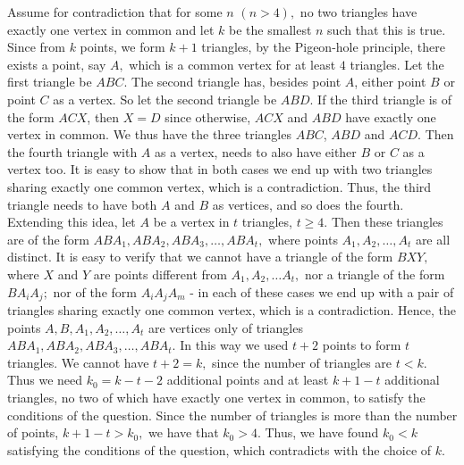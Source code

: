 \documentclass{article}
\begin{document}
\begin{enumerate}[1.]
Assume for contradiction that for some $n$ $(n>4),$ no two triangles have exactly one vertex in common and let $k$ be the smallest $n$ such that this is true. Since from $k$ points, we form $k+1$ triangles, by the Pigeon-hole principle, there exists a point, say $A,$ which is a common vertex for at least $4$ triangles. Let the first triangle be $ABC$. The second triangle has, besides point $A$, either point $B$ or point $C$ as a vertex. So let the second triangle be $ABD$. If the third triangle is of the form $ACX$, then $X=D$ since otherwise, $ACX$ and $ABD$ have exactly one vertex in common. We thus have the three triangles $ABC$, $ABD$ and $ACD$. Then the fourth triangle with $A$ as a vertex, needs to also have either $B$ or $C$ as a vertex too. It is easy to show that in both cases we end up with two triangles sharing exactly one common vertex, which is a contradiction. Thus, the third triangle needs to have both $A$ and $B$ as vertices, and so does the fourth. \\
Extending this idea, let $A$ be a vertex in $t$ triangles, $t\geq 4.$ Then these triangles are of the form $ABA_1, ABA_2, ABA_3, \dots , ABA_t,$ where points $A_1, A_2, \dots , A_t$ are all distinct. It is easy to verify that we cannot have a triangle of the form $BXY,$ where $X$ and $Y$ are points different from $A_1, A_2, \dots A_t,$ nor a triangle of the form $BA_iA_j;$ nor of the form $A_iA_jA_m$ - in each of these cases we end up with a pair of triangles sharing exactly one common vertex, which is a contradiction. Hence, the points $A, B, A_1, A_2, \dots, A_t$ are vertices only of triangles $ABA_1, ABA_2, ABA_3, \dots , ABA_t.$ In this way we used $t+2$ points to form $t$ triangles. We cannot have $t+2 = k,$ since the number of triangles are $t<k.$ Thus we need $k_0 = k-t-2$ additional points and at least $k+1-t$ additional triangles, no two of which have exactly one vertex in common, to satisfy the conditions of the question. Since the number of triangles is more than the number of points, $k+1-t > k_0,$ we have that $k_0 >4.$ Thus, we have found $k_0 <k$ satisfying the conditions of the question, which contradicts with the choice of $k$.

\end{enumerate}
\end{document}

